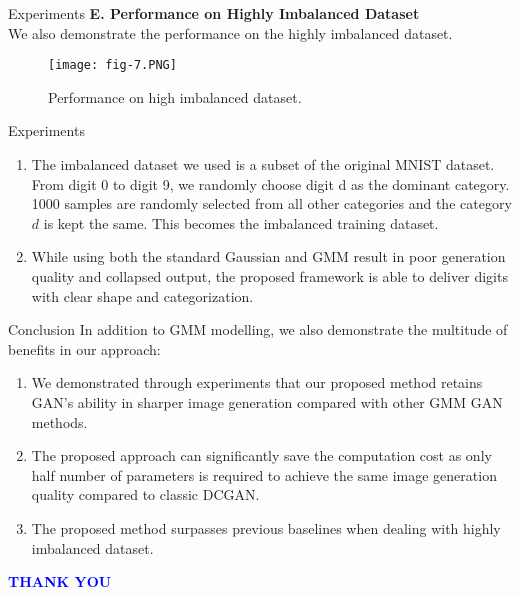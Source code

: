 \documentclass{beamer}
\begin{document}
\begin{frame}{Experiments}
 \textbf{E. Performance on Highly Imbalanced Dataset\\}   
 We also demonstrate the performance on the highly imbalanced dataset.
 \begin{figure}[!tbp]
  \centering
  {\texttt{[image: fig-7.PNG]}}
  \hfill
  
  \caption{Performance on high imbalanced dataset.}
\end{figure}
\end{frame}


\begin{frame}{Experiments}
\begin{enumerate}[]
  \item The imbalanced dataset we used is a subset of the original MNIST dataset. From digit 0 to digit 9, we randomly choose digit d as the dominant category. 1000 samples are randomly selected from all other categories and the category $d$ is kept the same. This becomes the imbalanced training dataset.
  \item While using both the standard Gaussian and GMM result in poor generation quality and collapsed output, the proposed framework is able to deliver digits with clear shape and categorization.
\end{enumerate}
\end{frame}



\begin{frame}{Conclusion}
  In addition to GMM modelling, we also demonstrate the multitude of benefits in
our approach: 
\begin{enumerate}
   \item We demonstrated through experiments that our proposed method retains GAN’s ability in sharper image generation compared with other GMM GAN methods.
   \item The proposed approach can significantly save the computation cost as only half number of parameters is required to achieve the same image generation quality compared to classic DCGAN.
   \item The proposed method surpasses previous baselines when dealing with highly imbalanced dataset.
\end{enumerate}
\end{frame}





\begin{frame}
   \centering
    \textcolor{blue}{\Huge{\textbf{THANK YOU}}}
\end{frame}
\end{document}
